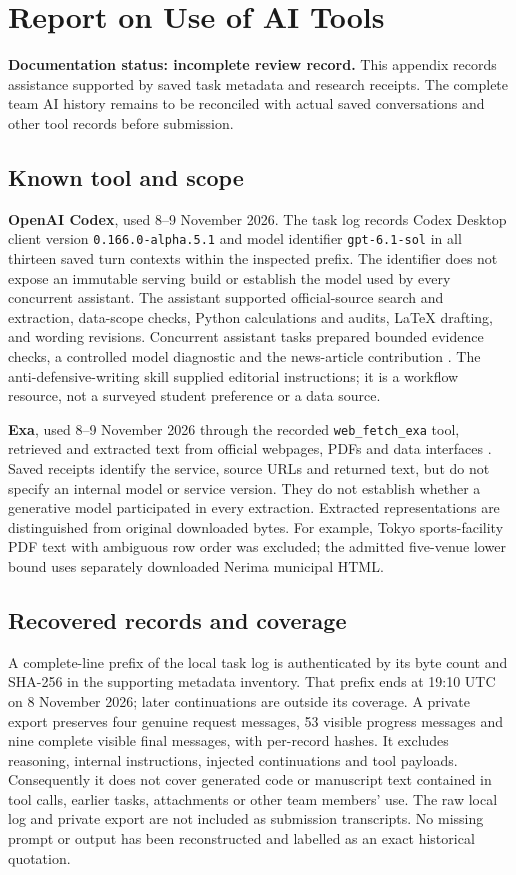 \section*{Report on Use of AI Tools}
\textbf{Documentation status: incomplete review record.}
This appendix records assistance supported by saved task metadata and research
receipts. The complete team AI history remains to be reconciled with actual
saved conversations and other tool records before submission.

\subsection*{Known tool and scope}
\textbf{OpenAI Codex}, used 8--9 November 2026. The task log records Codex
Desktop client version \texttt{0.166.0-alpha.5.1} and model identifier
\texttt{gpt-6.1-sol} in all thirteen saved turn contexts within the inspected prefix.
The identifier does not expose an immutable serving build or establish the
model used by every concurrent assistant. The assistant supported official-source
search and extraction, data-scope checks, Python calculations and audits,
LaTeX drafting, and wording revisions. Concurrent assistant tasks prepared
bounded evidence checks, a controlled model diagnostic and the news-article
contribution \cite{openai}. The anti-defensive-writing skill supplied editorial instructions;
it is a workflow resource, not a surveyed student preference or a data source.

\textbf{Exa}, used 8--9 November 2026 through the recorded
\texttt{web\_fetch\_exa} tool, retrieved and extracted text from official
webpages, PDFs and data interfaces \cite{exa}. Saved receipts identify the
service, source URLs and returned text, but do not specify an internal model
or service version. They do not establish whether a generative model
participated in every extraction. Extracted representations are distinguished
from original downloaded bytes. For example, Tokyo sports-facility PDF text
with ambiguous row order was excluded; the admitted five-venue lower bound
uses separately downloaded Nerima municipal HTML.

\clearpage
\subsection*{Recovered records and coverage}
A complete-line prefix of the local task log is authenticated by its byte count
and SHA-256 in the supporting metadata inventory. That prefix ends at
19:10 UTC on 8 November 2026; later continuations are outside its coverage.
A private export preserves
four genuine request messages, 53 visible progress messages and nine complete
visible final messages, with per-record hashes. It excludes reasoning, internal
instructions, injected continuations and tool payloads. Consequently it does
not cover generated code or manuscript text contained in tool calls, earlier
tasks, attachments or other team members' use. The raw local log and private
export are not included as submission transcripts. No missing prompt or output
has been reconstructed and labelled as an exact historical quotation.

